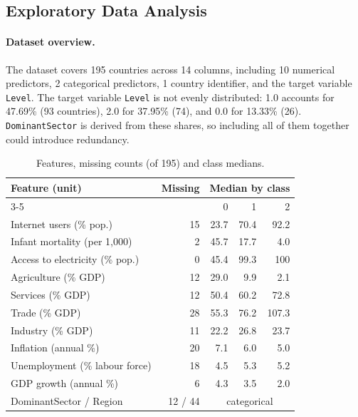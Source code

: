\documentclass[11pt,a4paper]{article}
\renewcommand{\_}{\oldus\allowbreak}
\begin{document}
\subsection{Exploratory Data Analysis}
\label{sec:eda}

\paragraph{Dataset overview.} The dataset covers 195 countries across 14
columns, including 10 numerical predictors, 2 categorical predictors, 1
country identifier, and the target variable \texttt{Level}. The target
variable \texttt{Level} is not evenly distributed: 1.0 accounts for 47.69\%
(93 countries), 2.0 for 37.95\% (74), and 0.0 for 13.33\% (26).
\texttt{Dominant\_Sector} is derived from these shares, so including all of
them together could introduce redundancy.

\begin{table}[h]
\centering
\footnotesize
\caption{Features, missing counts (of 195) and class medians.}
\label{tab:features}
\begin{tabular}{@{}lrrrr@{}}
\toprule
Feature (unit) & Missing & \multicolumn{3}{c}{Median by class} \\
\cmidrule(l){3-5}
 & & 0 & 1 & 2 \\
\midrule
Internet users (\% pop.)        & 15 & 23.7 & 70.4 & 92.2 \\
Infant mortality (per 1{,}000)  & 2  & 45.7 & 17.7 & 4.0 \\
Access to electricity (\% pop.) & 0  & 45.4 & 99.3 & 100 \\
Agriculture (\% GDP)            & 12 & 29.0 & 9.9  & 2.1 \\
Services (\% GDP)               & 12 & 50.4 & 60.2 & 72.8 \\
Trade (\% GDP)                  & 28 & 55.3 & 76.2 & 107.3 \\
Industry (\% GDP)               & 11 & 22.2 & 26.8 & 23.7 \\
Inflation (annual \%)           & 20 & 7.1  & 6.0  & 5.0 \\
Unemployment (\% labour force)  & 18 & 4.5  & 5.3  & 5.2 \\
GDP growth (annual \%)          & 6  & 4.3  & 3.5  & 2.0 \\
Dominant\_Sector / Region       & 12 / 44 & \multicolumn{3}{c}{categorical} \\
\bottomrule
\end{tabular}
\end{table}
\end{document}
